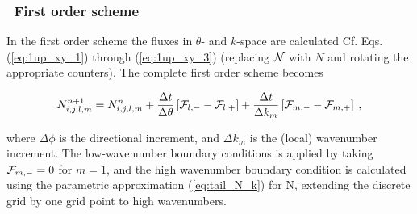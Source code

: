 \vssub
\subsubsection{~First order scheme}

\noindent
In the first order scheme the fluxes in $\theta$- and $k$-space are calculated
Cf. Eqs. (\ref{eq:1up_xy_1}) through (\ref{eq:1up_xy_3}) (replacing ${\cal N}$ with
$N$ and rotating the appropriate counters). The complete first order scheme
becomes


\begin{equation}
N_{i,j,l,m}^{n+1} = N_{i,j,l,m}^n 
 + \frac{\Delta t}{\Delta \theta} \left [ {\cal F}_{l,-} - {\cal F}_{l,+} \right ]
 + \frac{\Delta t}{\Delta k_m} \left [ {\cal F}_{m,-} - {\cal F}_{m,+} \right ]
\: , \label{eq:1up_intra_tot} \end{equation}

\noindent
where $\Delta \phi$ is the directional increment, and $\Delta k_m$ is the
(local) wavenumber increment. The low-wavenumber boundary conditions is
applied by taking ${\cal F}_{m,-}=0$ for $m=1$, and the high wavenumber boundary
condition is calculated using the parametric approximation (\ref{eq:tail_N_k})
for N, extending the discrete grid by one grid point to high wavenumbers.